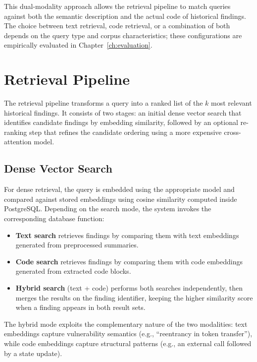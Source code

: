 This dual-modality approach allows the retrieval pipeline to match queries against both the semantic description and the actual code of historical findings. The choice between text retrieval, code retrieval, or a combination of both depends on the query type and corpus characteristics; these configurations are empirically evaluated in Chapter~\ref{ch:evaluation}.

\section{Retrieval Pipeline}
\label{sec:retrieval}

The retrieval pipeline transforms a query into a ranked list of the $k$ most relevant historical findings. It consists of two stages: an initial dense vector search that identifies candidate findings by embedding similarity, followed by an optional re-ranking step that refines the candidate ordering using a more expensive cross-attention model.

\subsection{Dense Vector Search}
\label{subsec:vector-search}

For dense retrieval, the query is embedded using the appropriate model and compared against stored embeddings using cosine similarity computed inside PostgreSQL. Depending on the search mode, the system invokes the corresponding database function:

\begin{itemize}
    \item \textbf{Text search} retrieves findings by comparing them with text embeddings generated from preprocessed summaries.
    \item \textbf{Code search} retrieves findings by comparing them with code embeddings generated from extracted code blocks.
    \item \textbf{Hybrid search} (text + code) performs both searches independently, then merges the results on the finding identifier, keeping the higher similarity score when a finding appears in both result sets.
\end{itemize}

The hybrid mode exploits the complementary nature of the two modalities: text embeddings capture vulnerability semantics (e.g., ``reentrancy in token transfer''), while code embeddings capture structural patterns (e.g., an external call followed by a state update).

